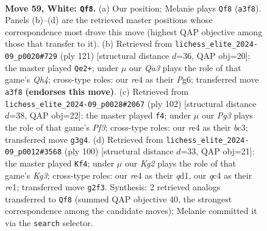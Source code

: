 \documentclass[11pt]{article}
\begin{document}
\clearpage

\begin{figure}[p]\centering
\begin{subfigure}{0.46\textwidth}\centering
\resizebox{\linewidth}{!}{%
\newchessgame
\chessboard[
  setfen={8/8/5pk1/3p4/2q1r3/Q5P1/P5KP/8 w - - 12 59},
  showmover=false,
  pgfstyle=straightmove, color=movearrow, markmove={a3-f8}
]}
\caption{}
\end{subfigure}\hfill
\begin{subfigure}{0.46\textwidth}\centering
\resizebox{\linewidth}{!}{%
\newchessgame
\chessboard[
  setfen={8/3QP3/1p4p1/2k2p1q/8/6P1/6K1/8 b - - 2 61},
  showmover=false,
  pgfstyle=straightmove, color=movearrow, markmove={h5-e2}
]}
\caption{}
\end{subfigure}
\\[4pt]
\begin{subfigure}{0.46\textwidth}\centering
\resizebox{\linewidth}{!}{%
\newchessgame
\chessboard[
  setfen={8/6pk/5q2/5P2/4Q1KP/2b2P2/5P2/8 w - - 21 52},
  showmover=false,
  pgfstyle=straightmove, color=movearrow, markmove={f3-f4}
]}
\caption{}
\end{subfigure}\hfill
\begin{subfigure}{0.46\textwidth}\centering
\resizebox{\linewidth}{!}{%
\newchessgame
\chessboard[
  setfen={8/7R/8/3p4/4p2P/k3P1K1/5P2/3qr3 w - - 2 51},
  showmover=false,
  pgfstyle=straightmove, color=movearrow, markmove={g3-f4}
]}
\caption{}
\end{subfigure}
\caption{\textbf{Move 59, White: \texttt{Qf8}.} (a) Our position; Melanie plays \texttt{Qf8} (\texttt{a3f8}). Panels (b)--(d) are the retrieved master positions whose correspondence most drove this move (highest QAP objective among those that transfer to it). (b) Retrieved from \texttt{lichess\_elite\_2024-09\_p0020\#729} (ply 121) [structural distance $d$=36, QAP obj=20]: the master played \texttt{Qe2+}; under $\mu$ our \emph{Qa3} plays the role of that game's \emph{Qh4}; cross-type roles: our \emph{r}e4 as their \emph{P}g6; transferred move \texttt{a3f8} \textbf{(endorses this move)}. (c) Retrieved from \texttt{lichess\_elite\_2024-09\_p0028\#2067} (ply 102) [structural distance $d$=38, QAP obj=22]: the master played \texttt{f4}; under $\mu$ our \emph{Pg3} plays the role of that game's \emph{Pf3}; cross-type roles: our \emph{r}e4 as their \emph{b}c3; transferred move \texttt{g3g4}. (d) Retrieved from \texttt{lichess\_elite\_2024-09\_p0012\#3568} (ply 100) [structural distance $d$=33, QAP obj=21]: the master played \texttt{Kf4}; under $\mu$ our \emph{Kg2} plays the role of that game's \emph{Kg3}; cross-type roles: our \emph{r}e4 as their \emph{q}d1, our \emph{q}c4 as their \emph{r}e1; transferred move \texttt{g2f3}. Synthesis: 2 retrieved analogs transferred to \texttt{Qf8} (summed QAP objective 40, the strongest correspondence among the candidate moves); Melanie committed it via the \texttt{search} selector.}
\label{fig:thought-m116}
\end{figure}
\end{document}
